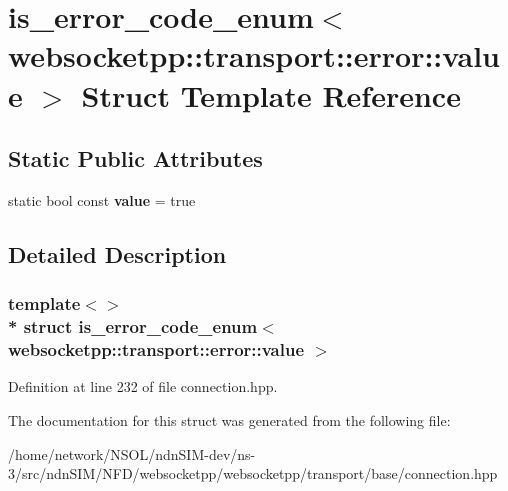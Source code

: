 \hypertarget{structis__error__code__enum_3_01websocketpp_1_1transport_1_1error_1_1value_01_4}{}\section{is\+\_\+error\+\_\+code\+\_\+enum$<$ websocketpp\+:\+:transport\+:\+:error\+:\+:value $>$ Struct Template Reference}
\label{structis__error__code__enum_3_01websocketpp_1_1transport_1_1error_1_1value_01_4}
\subsection*{Static Public Attributes}
\begin{DoxyCompactItemize}
\item 
static bool const {\bfseries value} = true\hypertarget{structis__error__code__enum_3_01websocketpp_1_1transport_1_1error_1_1value_01_4_a75058d7048e16ee883f1b54b4e5bcbbf}{}\label{structis__error__code__enum_3_01websocketpp_1_1transport_1_1error_1_1value_01_4_a75058d7048e16ee883f1b54b4e5bcbbf}

\end{DoxyCompactItemize}


\subsection{Detailed Description}
\subsubsection*{template$<$$>$\\*
struct is\+\_\+error\+\_\+code\+\_\+enum$<$ websocketpp\+::transport\+::error\+::value $>$}



Definition at line 232 of file connection.\+hpp.



The documentation for this struct was generated from the following file\+:\begin{DoxyCompactItemize}
\item 
/home/network/\+N\+S\+O\+L/ndn\+S\+I\+M-\/dev/ns-\/3/src/ndn\+S\+I\+M/\+N\+F\+D/websocketpp/websocketpp/transport/base/connection.\+hpp\end{DoxyCompactItemize}
